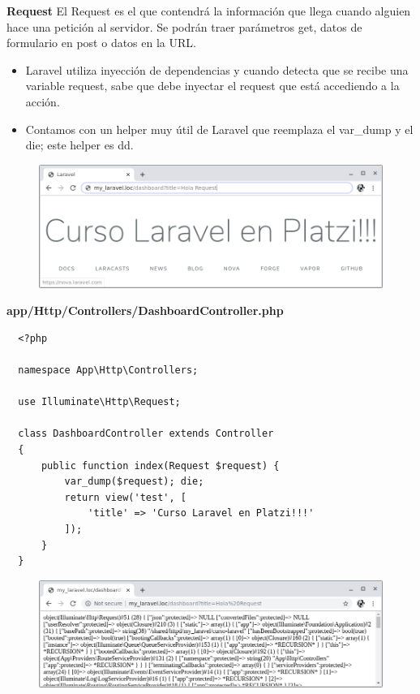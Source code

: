 \documentclass{article}
\begin{document}
\textbf{Request}
El Request es el que contendrá la información que llega cuando alguien hace una
petición al servidor. Se podrán traer parámetros get, datos de formulario en
post o datos en la URL.\\

\begin{itemize}
  \item Laravel utiliza inyección de dependencias y cuando detecta que se
    recibe una variable request, sabe que debe inyectar el request que está
    accediendo a la acción.
  \item Contamos con un helper muy útil de Laravel que reemplaza el var\_dump y
    el die; este helper es dd.
\end{itemize}

\begin{figure}[h!]
  \centering
  \includegraphics[scale=0.5]{./Pictures/015_request.png}
\end{figure}

\textbf{app/Http/Controllers/DashboardController.php}
\begin{verbatim}
  <?php

  namespace App\Http\Controllers;

  use Illuminate\Http\Request;

  class DashboardController extends Controller
  {
      public function index(Request $request) {
          var_dump($request); die;
          return view('test', [
              'title' => 'Curso Laravel en Platzi!!!'
          ]);
      }
  }
\end{verbatim}

\begin{figure}[h!]
  \centering
  \includegraphics[scale=0.5]{./Pictures/016_vardump_request.png}
\end{figure}
\end{document}
